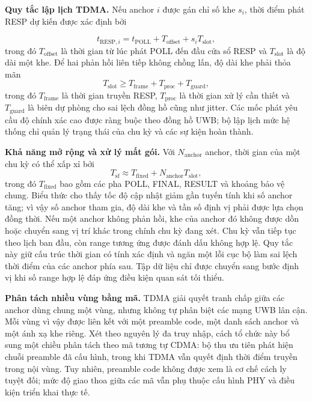 \documentclass[
  a4paper,
]{report}
\begin{document}
\textbf{Quy tắc lập lịch TDMA.} Nếu anchor $i$ được gán chỉ số khe $s_i$, thời
điểm phát RESP dự kiến được xác định bởi

\begin{equation}
  t_{\mathrm{RESP},i}=t_{\mathrm{POLL}}+T_{\mathrm{offset}}
  +s_iT_{\mathrm{slot}},
  \label{eq:tdma-response-time}
\end{equation}
trong đó $T_{\mathrm{offset}}$ là thời gian từ lúc phát POLL đến đầu cửa sổ
RESP và $T_{\mathrm{slot}}$ là độ dài một khe. Để hai phản hồi liên tiếp không
chồng lấn, độ dài khe phải thỏa mãn
\begin{equation}
  T_{\mathrm{slot}}\geq
  T_{\mathrm{frame}}+T_{\mathrm{proc}}+T_{\mathrm{guard}},
  \label{eq:tdma-slot-condition}
\end{equation}
trong đó $T_{\mathrm{frame}}$ là thời gian truyền RESP,
$T_{\mathrm{proc}}$ là thời gian xử lý cần thiết và $T_{\mathrm{guard}}$ là
biên dự phòng cho sai lệch đồng hồ cũng như jitter. Các mốc phát yêu cầu độ
chính xác cao được ràng buộc theo đồng hồ UWB; bộ lập lịch mức hệ thống chỉ quản
lý trạng thái của chu kỳ và các sự kiện hoàn thành.

\textbf{Khả năng mở rộng và xử lý mất gói.} Với $N_{\mathrm{anchor}}$ anchor,
thời gian của một chu kỳ có thể xấp xỉ bởi
\begin{equation}
  T_{\mathrm{sf}}\approx T_{\mathrm{fixed}}+
  N_{\mathrm{anchor}}T_{\mathrm{slot}},
  \label{eq:tdma-superframe-duration}
\end{equation}
trong đó $T_{\mathrm{fixed}}$ bao gồm các pha POLL, FINAL, RESULT và khoảng bảo
vệ chung. Biểu thức cho thấy tốc độ cập nhật giảm gần tuyến tính khi số anchor
tăng; vì vậy số anchor tham gia, độ dài khe và tần số định vị phải được lựa chọn
đồng thời. Nếu một anchor không phản hồi, khe của anchor đó không được dồn hoặc
chuyển sang vị trí khác trong chính chu kỳ đang xét. Chu kỳ vẫn tiếp tục theo
lịch ban đầu, còn range tương ứng được đánh dấu không hợp lệ. Quy tắc này giữ
cấu trúc thời gian có tính xác định và ngăn một lỗi cục bộ làm sai lệch thời
điểm của các anchor phía sau. Tập dữ liệu chỉ được chuyển sang bước định vị khi
số range hợp lệ đáp ứng điều kiện quan sát tối thiểu.

\textbf{Phân tách nhiều vùng bằng mã.} TDMA giải quyết tranh chấp giữa các
anchor dùng chung một vùng, nhưng không tự phân biệt các mạng UWB lân cận. Mỗi
vùng vì vậy được liên kết với một preamble code, một danh sách anchor và một
ánh xạ khe riêng. Xét theo nguyên lý đa truy nhập, cách tổ chức này bổ sung một
chiều phân tách theo mã tương tự CDMA: bộ thu ưu tiên phát hiện chuỗi preamble
đã cấu hình, trong khi TDMA vẫn quyết định thời điểm truyền trong nội vùng.
Tuy nhiên, preamble code không được xem là cơ chế cách ly tuyệt đối; mức độ
giao thoa giữa các mã vẫn phụ thuộc cấu hình PHY và điều kiện triển khai thực
tế.
\end{document}
